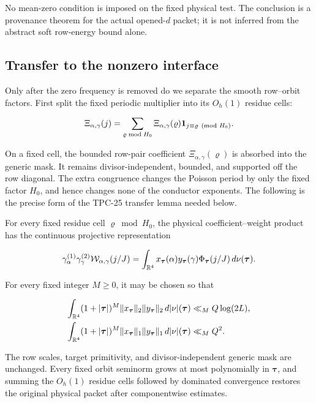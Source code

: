 No mean-zero condition is imposed on the fixed physical test.  The
conclusion is a provenance theorem for the actual opened-\(d\) packet;
it is not inferred from the abstract soft row-energy bound alone.

\subsection{Transfer to the nonzero interface}

Only after the zero frequency is removed do we separate the smooth
row--orbit factors.  First split the fixed periodic multiplier into its
\(O_h(1)\) residue cells:

\begin{equation}
 \Xi_{\alpha,\gamma}(j)
 =\sum_{\varrho\bmod H_0}
 \Xi_{\alpha,\gamma}(\varrho)
 \mathbf 1_{j\equiv\varrho\pmod{H_0}}.
 \label{eq:tpc26-fixed-residue-split}
\end{equation}

On a fixed cell, the bounded row-pair coefficient
\(\Xi_{\alpha,\gamma}(\varrho)\) is absorbed into the generic mask.
It remains divisor-independent, bounded, and supported off the row
diagonal.  The extra congruence changes the Poisson period by only the
fixed factor \(H_0\), and hence changes none of the conductor exponents.
The following is the precise form of the TPC-25 transfer lemma needed
below.

\begin{lemma}
\label{lem:tpc26-physical-transfer}
For every fixed residue cell \(\varrho\bmod H_0\), the physical
coefficient--weight product has the continuous projective
representation

\begin{equation}
 \gamma_\alpha^{(1)}\gamma_\gamma^{(2)}
 \mathcal W_{\alpha,\gamma}(j/J)
 =
 \int_{\mathbb R^4}
 x_{\boldsymbol\tau}(\alpha)
 y_{\boldsymbol\tau}(\gamma)
 \Phi_{\boldsymbol\tau}(j/J)
 \,d\nu(\boldsymbol\tau).
 \label{eq:tpc26-continuous-transfer}
\end{equation}

For every fixed integer \(M\ge0\), it may be chosen so that

\begin{align}
 \int_{\mathbb R^4}(1+|\boldsymbol\tau|)^M
 \|x_{\boldsymbol\tau}\|_2
 \|y_{\boldsymbol\tau}\|_2
 \,d|\nu|(\boldsymbol\tau)
 &\ll_M Q\log(2L),
 \label{eq:tpc26-transfer-l2}\\
 \int_{\mathbb R^4}(1+|\boldsymbol\tau|)^M
 \|x_{\boldsymbol\tau}\|_1
 \|y_{\boldsymbol\tau}\|_1
 \,d|\nu|(\boldsymbol\tau)
 &\ll_M Q^2.
 \label{eq:tpc26-transfer-l1}
\end{align}

The row scales, target primitivity, and divisor-independent generic mask
are unchanged.  Every fixed orbit seminorm grows at most polynomially
in \(\boldsymbol\tau\), and summing the \(O_h(1)\) residue cells followed
by dominated convergence restores the original physical packet after
componentwise estimates.
\end{lemma}

